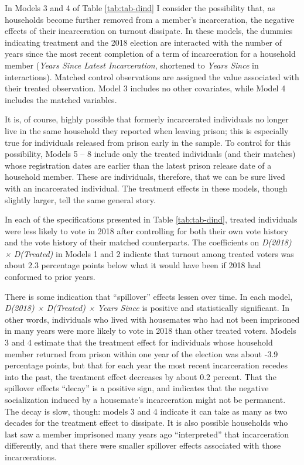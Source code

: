 \documentclass[
  12pt,
]{article}
\begin{document}
In Models 3 and 4 of Table \ref{tab:tab-dind} I consider the possibility that, as households become further removed from a member's incarceration, the negative effects of their incarceration on turnout dissipate. In these models, the dummies indicating treatment and the 2018 election are interacted with the number of years since the most recent completion of a term of incarceration for a household member (\emph{Years Since Latest Incarceration}, shortened to \emph{Years Since} in interactions). Matched control observations are assigned the value associated with their treated observation. Model 3 includes no other covariates, while Model 4 includes the matched variables.

It is, of course, highly possible that formerly incarcerated individuals no longer live in the same household they reported when leaving prison; this is especially true for individuals released from prison early in the sample. To control for this possibility, Models 5 -- 8 include only the treated individuals (and their matches) whose registration dates are earlier than the latest prison release date of a household member. These are individuals, therefore, that we can be sure lived with an incarcerated individual. The treatment effects in these models, though slightly larger, tell the same general story.

\begin{singlespace}

\end{singlespace}

In each of the specifications presented in Table \ref{tab:tab-dind}, treated individuals were less likely to vote in 2018 after controlling for both their own vote history and the vote history of their matched counterparts. The coefficients on \emph{D(2018) × D(Treated)} in Models 1 and 2 indicate that turnout among treated voters was about 2.3 percentage points below what it would have been if 2018 had conformed to prior years.

There is some indication that ``spillover'' effects lessen over time. In each model, \emph{D(2018) × D(Treated) × Years Since} is positive and statistically significant. In other words, individuals who lived with housemates who had not been imprisoned in many years were more likely to vote in 2018 than other treated voters. Models 3 and 4 estimate that the treatment effect for individuals whose household member returned from prison within one year of the election was about -3.9 percentage points, but that for each year the most recent incarceration recedes into the past, the treatment effect decreases by about 0.2 percent. That the spillover effects ``decay'' is a positive sign, and indicates that the negative socialization induced by a housemate's incarceration might not be permanent. The decay is slow, though: models 3 and 4 indicate it can take as many as two decades for the treatment effect to dissipate. It is also possible households who last saw a member imprisoned many years ago ``interpreted'' that incarceration differently, and that there were smaller spillover effects associated with those incarcerations.
\end{document}

